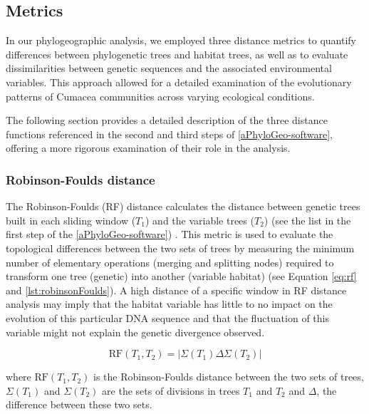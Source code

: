 \subsection{Metrics}\label{metrics}
In our phylogeographic analysis, we employed three distance metrics to quantify differences between phylogenetic trees and habitat trees, as well as to evaluate dissimilarities between genetic sequences and the associated environmental variables. This approach allowed for a detailed examination of the evolutionary patterns of Cumacea communities across varying ecological conditions.

The following section provides a detailed description of the three distance functions referenced in the second and third steps of \autoref{aPhyloGeo-software}, offering a more rigorous examination of their role in the analysis.

\subsubsection{Robinson-Foulds distance}\label{RF}
The Robinson-Foulds (RF) distance \citep{robinson_comparison_1981} calculates the distance between genetic trees built in each sliding window ($T_1$) and the variable trees ($T_2$) (see the list in the first step of the \autoref{aPhyloGeo-software}) \citep{li2024comparison, tahiri2018new}. This metric is used to evaluate the topological differences between the two sets of trees by measuring the minimum number of elementary operations (merging and splitting nodes) required to transform one tree (genetic) into another (variable habitat) (see Equation \eqref{eq:rf} and \autoref{lst:robinsonFoulds}). A high distance of a specific window in RF distance analysis may imply that the habitat variable has little to no impact on the evolution of this particular DNA sequence and that the fluctuation of this variable might not explain the genetic divergence observed.

\begin{equation}\label{eq:rf}
    \text{RF}(T_1, T_2) = | \Sigma(T_1) \Delta \Sigma(T_2) |
\end{equation}

where $\text{RF}(T_1, T_2)$ is the Robinson-Foulds distance between the two sets of trees, $\Sigma(T_1)$ and $\Sigma(T_2)$ are the sets of divisions in trees $T_1$ and $T_2$ and $ \Delta $, the difference between these two sets.

